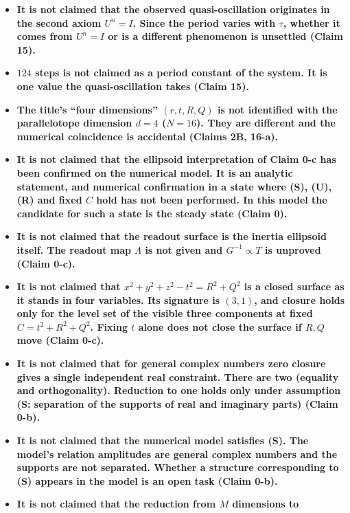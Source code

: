 \documentclass[
  10pt,
]{article}
\begin{document}
\begin{itemize}
  \textbf{It is not claimed that the numerical model of this series
  reaches a steady state. It does not within \(T=40000\) (Claim 10).}
\item
  \textbf{It is not claimed that the observed quasi-oscillation
  originates in the second axiom \(U^n=I\). Since the period varies with
  \(\tau\), whether it comes from \(U^n=I\) or is a different phenomenon
  is unsettled (Claim 15).}
\item
  \textbf{\(124\) steps is not claimed as a period constant of the
  system. It is one value the quasi-oscillation takes (Claim 15).}
\item
  \textbf{The title's ``four dimensions'' \((r,t,R,Q)\) is not
  identified with the parallelotope dimension \(d=4\) (\(N=16\)). They
  are different and the numerical coincidence is accidental (Claims 2B,
  16-a).}
\item
  \textbf{It is not claimed that the ellipsoid interpretation of Claim
  0-c has been confirmed on the numerical model. It is an analytic
  statement, and numerical confirmation in a state where (S), (U), (R)
  and fixed \(C\) hold has not been performed. In this model the
  candidate for such a state is the steady state (Claim 0).}
\item
  \textbf{It is not claimed that the readout surface is the inertia
  ellipsoid itself. The readout map \(\Lambda\) is not given and
  \(G^{-1}\propto T\) is unproved (Claim 0-c).}
\item
  \textbf{It is not claimed that \(x^2+y^2+z^2-t^2 = R^2+Q^2\) is a
  closed surface as it stands in four variables. Its signature is
  \((3,1)\), and closure holds only for the level set of the visible
  three components at fixed \(C = t^2+R^2+Q^2\). Fixing \(t\) alone does
  not close the surface if \(R,Q\) move (Claim 0-c).}
\item
  \textbf{It is not claimed that for general complex numbers zero
  closure gives a single independent real constraint. There are two
  (equality and orthogonality). Reduction to one holds only under
  assumption (S: separation of the supports of real and imaginary parts)
  (Claim 0-b).}
\item
  \textbf{It is not claimed that the numerical model satisfies (S). The
  model's relation amplitudes are general complex numbers and the
  supports are not separated. Whether a structure corresponding to (S)
  appears in the model is an open task (Claim 0-b).}
\item
  \textbf{It is not claimed that the reduction from \(M\) dimensions to
}
\end{itemize}
\end{document}

